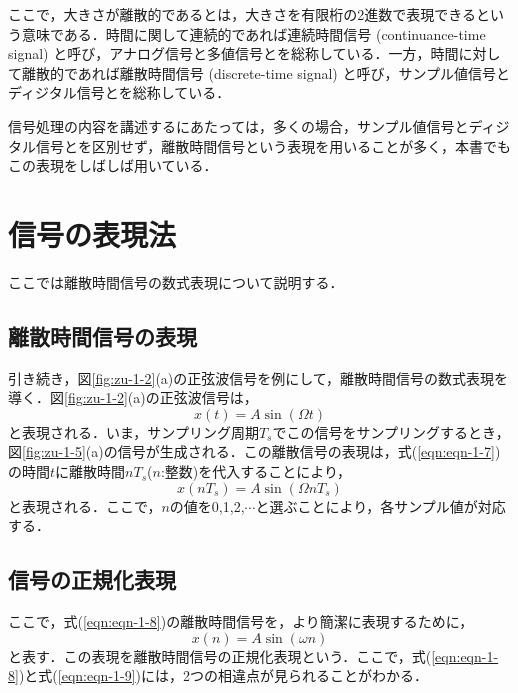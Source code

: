 ここで，大きさが離散的であるとは，大きさを有限桁の2進数で表現できるという意味である．時間に関して連続的であれば連続時間信号 (continuance-time signal) と呼び，アナログ信号と多値信号とを総称している．一方，時間に対して離散的であれば離散時間信号 (discrete-time signal) と呼び，サンプル値信号とディジタル信号とを総称している．

信号処理の内容を講述するにあたっては，多くの場合，サンプル値信号とディジタル信号とを区別せず，離散時間信号という表現を用いることが多く，本書でもこの表現をしばしば用いている．

\section{信号の表現法}

ここでは離散時間信号の数式表現について説明する．

\subsection{離散時間信号の表現}

引き続き，図\ref{fig:zu-1-2}(a)の正弦波信号を例にして，離散時間信号の数式表現を導く．図\ref{fig:zu-1-2}(a)の正弦波信号は，
\begin{equation}
x(t)=A \sin (\Omega t)
\label{eqn:eqn-1-7}
\end{equation}
と表現される．いま，サンプリング周期$T_s$でこの信号をサンプリングするとき，図\ref{fig:zu-1-5}(a)の信号が生成される．この離散信号の表現は，式(\ref{eqn:eqn-1-7})の時間$t$に離散時間$nT_s$($n$:整数)を代入することにより，
\begin{equation}
x(nT_s)=A \sin (\Omega nT_s)
\label{eqn:eqn-1-8}
\end{equation}
と表現される．ここで，$n$の値を0,1,2,$\cdots$と選ぶことにより，各サンプル値が対応する．

\subsection{信号の正規化表現}

ここで，式(\ref{eqn:eqn-1-8})の離散時間信号を，より簡潔に表現するために，
\begin{equation}
x(n)=A \sin (\omega n)
\label{eqn:eqn-1-9}
\end{equation}
と表す．この表現を離散時間信号の正規化表現という．ここで，式(\ref{eqn:eqn-1-8})と式(\ref{eqn:eqn-1-9})には，2つの相違点が見られることがわかる．

